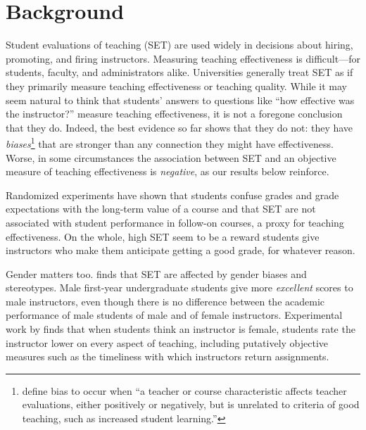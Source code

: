 \documentclass[12pt]{article}
\begin{document}
\begin{abstract}
%

\end{abstract}

\newpage

\section{Background}
Student evaluations of teaching (SET) are used widely 
in decisions about hiring, promoting, and firing instructors. 
Measuring teaching effectiveness is difficult---for students,
faculty, and administrators alike.
Universities generally treat SET as if they primarily
measure teaching effectiveness or teaching quality.
While it may seem natural to think that students' answers to questions like
``how effective was the instructor?'' measure teaching effectiveness,
it is not a foregone conclusion that they do.
Indeed, the best evidence so far shows that they do not:
they have \emph{biases}\footnote{%
  \citet[p.17]{Centra2000} define bias to occur when ``a teacher
   or course characteristic affects teacher evaluations, either positively or
negatively, but is unrelated to criteria of good teaching, such as increased student learning.'' 
}
that are stronger than any connection they might have effectiveness.
Worse, in some circumstances the association between SET and an objective measure
of teaching effectiveness is
\emph{negative}, as our results below reinforce.

Randomized experiments \citep{Carrell2010a,Braga2014}
have shown that students confuse grades 
and grade expectations with the long-term value of a course and that SET are not associated with 
student performance in follow-on courses, a proxy for teaching effectiveness. 
On the whole, high SET seem to be a reward students give 
instructors who make them anticipate getting a good grade, for whatever reason.

Gender matters too.
\citet{Boring2015} finds that SET are affected by gender biases and stereotypes. 
Male first-year undergraduate students give more \emph{excellent} scores to male instructors,
even though there is no difference between
the academic performance of male students of male and of female instructors.
Experimental work by \citet{MacNell2014} finds that when students think
an instructor is female,
students rate the instructor lower on every aspect of teaching,
including putatively objective measures such as the timeliness with which instructors
return assignments.
\end{document}
